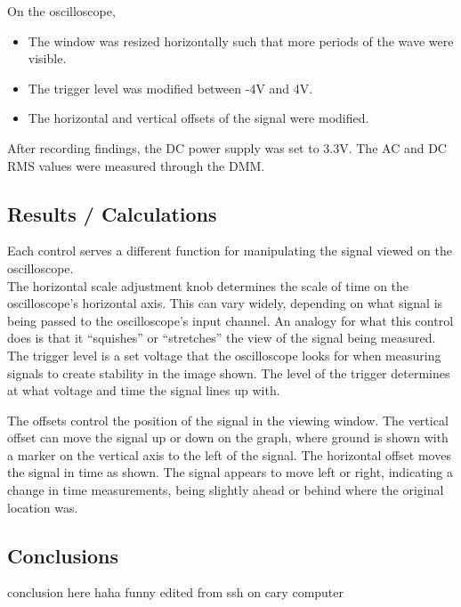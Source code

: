 \documentclass[notitlepage, 12pt]{report}  %
\begin{document}
\noindent On the oscilloscope, 

\begin{itemize} %

    \item{The window was resized horizontally such that more periods of the wave were visible.}

    \item{The trigger level was modified between -4V and 4V.}

    \item{The horizontal and vertical offsets of the signal were modified.}
    
\end{itemize}

After recording findings, the DC power supply was set to 3.3V. The AC and DC RMS values were measured through 
the DMM.\\


\subsection*{Results / Calculations}

\indent\indent Each control serves a different function for manipulating the signal viewed on the oscilloscope. \\

The horizontal scale adjustment knob determines the scale of time on the oscilloscope's horizontal axis. 
This can vary widely, depending on what signal is being passed to the oscilloscope's input channel. 
An analogy for what this control does is that it ``squishes'' or ``stretches'' the view of the signal being measured. \\

The trigger level is a set voltage that the oscilloscope looks for when measuring signals to create stability in the
image shown. The level of the trigger determines at what voltage and time the signal lines up with. 

The offsets control the position of the signal in the viewing window. The vertical offset can move the signal up 
or down on the graph, where ground is shown with a marker on the vertical axis to the left of the signal. The
horizontal offset moves the signal in time as shown. The signal appears to move left or right, indicating a 
change in time measurements, being slightly ahead or behind where the original location was. \\




\subsection*{Conclusions}


conclusion here haha funny edited from ssh on cary computer

\newpage

\printbibliography[title={\Large References}] %
\end{document}
